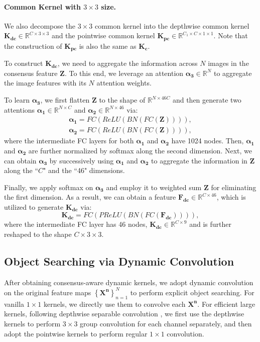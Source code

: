 \documentclass[10pt,twocolumn,letterpaper]{article}
\begin{document}
\vspace{-3mm}
\paragraph{Common Kernel with ${3 \times 3}$ size.}
We also decompose the $3 \times 3$ common kernel into the depthwise common kernel $\bm{K_{dc}}\in{\mathbb{R}^{C\times{3\times 3}}}$ and the pointwise common kernel $\bm{K_{pc}}\in{\mathbb{R}^{C_1\times{C\times{1\times 1}}}}$. Note that the construction of $\bm{K_{pc}}$ is also the same as $\bm{K_c}$.

To construct $\bm{K_{dc}}$, we need to aggregate the information across $N$ images in the consensus feature $\bm{Z}$. To this end, we leverage an attention $\bm{\alpha_3}\in{\mathbb{R}^{N}}$ to aggregate the image features with its $N$ attention weights.

To learn $\bm{\alpha_3}$, we first flatten $\bm{Z}$ to the shape of $\mathbb{R}^{N\times 46C}$ and then generate two attentions $\bm{\alpha_1}\in{\mathbb{R}^{N \times C}}$ and $\bm{\alpha_2}\in{\mathbb{R}^{N \times 46}}$ via:
\begin{equation} \label{1x1AdaKernelatt}
\begin{split}
\bm{\alpha_1}=FC(ReLU(BN(FC(\bm{Z})))), \\
\bm{\alpha_2}=FC(ReLU(BN(FC(\bm{Z})))),
\end{split}
\end{equation}
where the intermediate FC layers for both $\bm{\alpha_1}$ and $\bm{\alpha_2}$ have 1024 nodes.
Then, $\bm{\alpha_1}$ and ${\bm{\alpha_2}}$ are further normalized by softmax along the second dimension. Next, we can obtain $\bm{\alpha_3}$ by successively using $\bm{\alpha_1}$ and $\bm{\alpha_2}$ to aggregate the information in $\bm{Z}$ along the ``$C$" and the ``46" dimensions.


Finally, we apply softmax on $\bm{\alpha_3}$ and employ it to weighted sum $\bm{Z}$ for eliminating the first dimension. As a result, we can obtain a feature $\bm{F_{dc}}\in{\mathbb{R}^{C \times 46}}$, which is utilized to generate $\bm{K_{dc}}$ via:
\begin{equation} \label{1x1AdaKernelatt}
\bm{K_{dc}}=FC(PReLU(BN(FC(\bm{F_{dc}})))),
\end{equation}
where the intermediate FC layer has 46 nodes, $\bm{K_{dc}}\in{\mathbb{R}^{C \times 9}}$ and is further reshaped to the shape $C\times {3 \times 3}$.

\subsection{Object Searching via Dynamic Convolution}
After obtaining consensus-aware dynamic kernels, we adopt dynamic convolution on the original feature maps $\left\{\bm{X^n} \right\}^N_{n=1}$ to perform explicit object searching. 
For vanilla $1 \times 1$ kernels, we directly use them to convolve each $\bm{X^n}$. 
For efficient large kernels, following depthwise separable convolution \cite{howard2017mobilenets}, we first use the depthwise kernels to perform $3 \times 3$ group convolution for each channel separately, and then adopt the pointwise kernels to perform regular $1 \times 1$ convolution.
\end{document}
